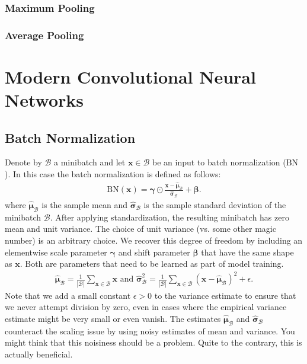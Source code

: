\documentclass[a4paper,12pt]{article}
\theoremstyle{definition}
\begin{document}
\subsubsection*{Maximum Pooling}

\subsubsection*{Average Pooling}


\section{Modern Convolutional Neural Networks}
\subsection*{Batch Normalization}
Denote by $\mathcal{B}$ a minibatch and let $\mathbf{x} \in \mathcal{B}$ be an input to batch normalization ($\mathrm{BN}$). In this case the batch normalization is defined as follows:
\begin{equation*}
    \begin{aligned}
        \mathrm{BN}(\mathbf{x}) = \boldsymbol{\gamma} \odot \frac{\mathbf{x} - \hat{\boldsymbol{\mu}}_\mathcal{B}}{\hat{\boldsymbol{\sigma}}_\mathcal{B}} + \boldsymbol{\beta}.
    \end{aligned}
\end{equation*}
where $\hat{\boldsymbol{\mu}}_\mathcal{B}$ is the sample mean and $\hat{\boldsymbol{\sigma}}_\mathcal{B}$
is the sample standard deviation of the minibatch $\mathcal{B}$. After applying standardization, the resulting minibatch has zero mean and unit variance. The choice of unit variance
(vs. some other magic number) is an arbitrary choice. We recover this degree of freedom by including an elementwise scale parameter $\boldsymbol{\gamma}$ and shift parameter $\boldsymbol{\beta}$
that have the same shape as $\mathbf{x}$. Both are parameters that need to be learned as part of model training.
\begin{equation*}
    \begin{aligned}
        \hat{\boldsymbol{\mu}}_\mathcal{B} = \frac{1}{|\mathcal{B}|} \sum_{\mathbf{x} \in \mathcal{B}} \mathbf{x}
        \text{ and }
        \hat{\boldsymbol{\sigma}}_\mathcal{B}^2 = \frac{1}{|\mathcal{B}|} \sum_{\mathbf{x} \in \mathcal{B}} (\mathbf{x} - \hat{\boldsymbol{\mu}}_{\mathcal{B}})^2 + \epsilon.
    \end{aligned}
\end{equation*}
Note that we add a small constant $\epsilon > 0$ to the variance estimate to ensure that we never attempt division by zero, even in cases where the empirical variance estimate
might be very small or even vanish. The estimates $\hat{\boldsymbol{\mu}}_\mathcal{B}$ and ${\hat{\boldsymbol{\sigma}}_\mathcal{B}}$
counteract the scaling issue by using noisy estimates of mean and variance. You might think that this noisiness should be a problem. Quite to the contrary, this is actually beneficial.
\end{document}
